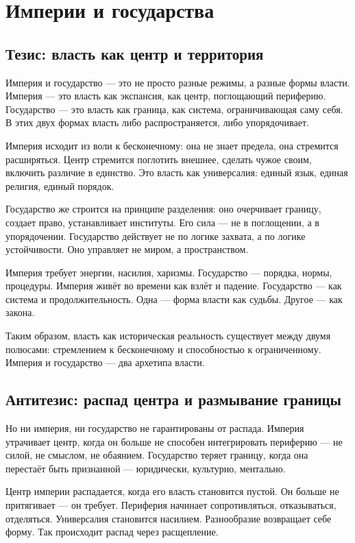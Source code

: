 \chapter{Империи и государства}

\section{Тезис: власть как центр и территория}

Империя и государство — это не просто разные режимы, а разные формы власти. Империя — это власть как экспансия, как центр, поглощающий периферию. Государство — это власть как граница, как система, ограничивающая саму себя. В этих двух формах власть либо распространяется, либо упорядочивает.

Империя исходит из воли к бесконечному: она не знает предела, она стремится расширяться. Центр стремится поглотить внешнее, сделать чужое своим, включить различие в единство. Это власть как универсалия: единый язык, единая религия, единый порядок.

Государство же строится на принципе разделения: оно очерчивает границу, создает право, устанавливает институты. Его сила — не в поглощении, а в упорядочении. Государство действует не по логике захвата, а по логике устойчивости. Оно управляет не миром, а пространством.

Империя требует энергии, насилия, харизмы. Государство — порядка, нормы, процедуры. Империя живёт во времени как взлёт и падение. Государство — как система и продолжительность. Одна — форма власти как судьбы. Другое — как закона.

Таким образом, власть как историческая реальность существует между двумя полюсами: стремлением к бесконечному и способностью к ограниченному. Империя и государство — два архетипа власти.

\section{Антитезис: распад центра и размывание границы}

Но ни империя, ни государство не гарантированы от распада. Империя утрачивает центр, когда он больше не способен интегрировать периферию — не силой, не смыслом, не обаянием. Государство теряет границу, когда она перестаёт быть признанной — юридически, культурно, ментально.

Центр империи распадается, когда его власть становится пустой. Он больше не притягивает — он требует. Периферия начинает сопротивляться, отказываться, отделяться. Универсалия становится насилием. Разнообразие возвращает себе форму. Так происходит распад через расщепление.

